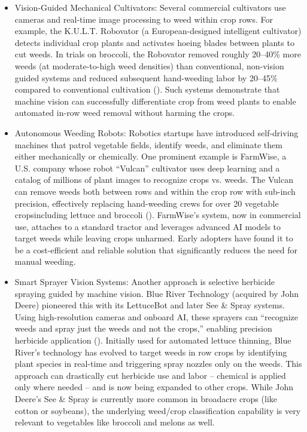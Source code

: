 \documentclass[letterpaper, notitlepage]{report}
\begin{document}
\begin{itemize}

	\item{Vision-Guided Mechanical Cultivators: Several commercial cultivators use cameras and real-time image processing to weed within crop rows. For example, the K.U.L.T. Robovator (a European-designed intelligent cultivator) detects individual crop plants and activates hoeing blades between plants to cut weeds. In trials on broccoli, the Robovator removed roughly 20–40\% more weeds (at moderate-to-high weed densities) than conventional, non-vision guided systems and reduced subsequent hand-weeding labor by 20–45\% compared to conventional cultivation (\cite{Lati2016-lb}). Such systems demonstrate that machine vision can successfully differentiate crop from weed plants to enable automated in-row weed removal without harming the crops.}

	\item{Autonomous Weeding Robots: Robotics startups have introduced self-driving machines that patrol vegetable fields, identify weeds, and eliminate them either mechanically or chemically. One prominent example is FarmWise, a U.S. company whose robot “Vulcan” cultivator uses deep learning and a catalog of millions of plant images to recognize crops vs. weeds. The Vulcan can remove weeds both between rows and within the crop row with sub-inch precision, effectively replacing hand-weeding crews for over 20 vegetable cropsincluding lettuce and broccoli (\cite{Farmwise2023-pi}). FarmWise’s system, now in commercial use, attaches to a standard tractor and leverages advanced AI models to target weeds while leaving crops unharmed. Early adopters have found it to be a cost-efficient and reliable solution that significantly reduces the need for manual weeding.}

	\item{Smart Sprayer Vision Systems: Another approach is selective herbicide spraying guided by machine vision. Blue River Technology (acquired by John Deere) pioneered this with its LettuceBot and later See \& Spray systems. Using high-resolution cameras and onboard AI, these sprayers can “recognize weeds and spray just the weeds and not the crops,” enabling precision herbicide application (\cite{Bedord2016-fa}). Initially used for automated lettuce thinning, Blue River’s technology has evolved to target weeds in row crops by identifying plant species in real-time and triggering spray nozzles only on the weeds. This approach can drastically cut herbicide use and labor – chemical is applied only where needed – and is now being expanded to other crops. While John Deere’s See \& Spray is currently more common in broadacre crops (like cotton or soybeans), the underlying weed/crop classification capability is very relevant to vegetables like broccoli and melons as well.}


\end{itemize}
\end{document}
